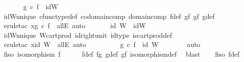 \begin{isabellebody}
\ \ \ \ \isamarkupfalse%
\ {}{\isacharcolon}{\kern0pt}\ {\isachardoublequoteopen}g\ {\isasymcirc}\isactrlsub c\ f\ {\isacharequal}{\kern0pt}\ idW{\isachardoublequoteclose}\isanewline
\ \ \ \ \ \ \isamarkupfalse%
\ idW{\isacharunderscore}{\kern0pt}unique\ cfunc{\isacharunderscore}{\kern0pt}type{\isacharunderscore}{\kern0pt}def\ codomain{\isacharunderscore}{\kern0pt}comp\ domain{\isacharunderscore}{\kern0pt}comp\ f{\isacharunderscore}{\kern0pt}def\ gf{}\ gf{}\ g{\isacharunderscore}{\kern0pt}def\ \isamarkupfalse%
\ {\isacharparenleft}{\kern0pt}erule{\isacharunderscore}{\kern0pt}tac\ x{\isacharequal}{\kern0pt}{\isachardoublequoteopen}g\ {\isasymcirc}\isactrlsub c\ f{\isachardoublequoteclose}\ \ allE{\isacharcomma}{\kern0pt}\ auto{\isacharparenright}{\kern0pt}\isanewline
\ \ \ \ \isamarkupfalse%
\ {}{\isacharcolon}{\kern0pt}\ {\isachardoublequoteopen}id\ W\ {\isacharequal}{\kern0pt}\ idW{\isachardoublequoteclose}\isanewline
\ \ \ \ \ \ \isamarkupfalse%
\ idW{\isacharunderscore}{\kern0pt}unique\ W{\isacharunderscore}{\kern0pt}cart{\isacharunderscore}{\kern0pt}prod\ id{\isacharunderscore}{\kern0pt}right{\isacharunderscore}{\kern0pt}unit{}\ id{\isacharunderscore}{\kern0pt}type\ is{\isacharunderscore}{\kern0pt}cart{\isacharunderscore}{\kern0pt}prod{\isacharunderscore}{\kern0pt}def\ \isamarkupfalse%
\ {\isacharparenleft}{\kern0pt}erule{\isacharunderscore}{\kern0pt}tac\ x{\isacharequal}{\kern0pt}{\isachardoublequoteopen}id\ W{\isachardoublequoteclose}\ \ allE{\isacharcomma}{\kern0pt}\ auto{\isacharparenright}{\kern0pt}\isanewline
\ \ \ \ \isamarkupfalse%
\ {}\ {}\ \isamarkupfalse%
\ {\isachardoublequoteopen}g\ {\isasymcirc}\isactrlsub c\ f\ {\isacharequal}{\kern0pt}\ id\ W{\isachardoublequoteclose}\isanewline
\ \ \ \ \ \ \isamarkupfalse%
\ auto\isanewline
\ \ \isamarkupfalse%
\isanewline
\isanewline
\ \ \isamarkupfalse%
\ f{\isacharunderscore}{\kern0pt}iso{\isacharcolon}{\kern0pt}\ {\isachardoublequoteopen}isomorphism\ f{\isachardoublequoteclose}\isanewline
\ \ \ \ \isamarkupfalse%
\ f{\isacharunderscore}{\kern0pt}def\ fg\ g{\isacharunderscore}{\kern0pt}def\ gf\ isomorphism{\isacharunderscore}{\kern0pt}def{}\ \isamarkupfalse%
\ blast\isanewline
\ \ \isamarkupfalse%
\ f{\isacharunderscore}{\kern0pt}iso\ f{\isacharunderscore}{\kern0pt}def\ \isamarkupfalse%

\end{isabellebody}

